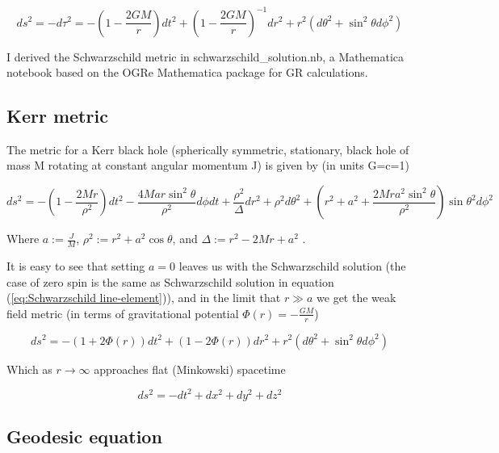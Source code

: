 \documentclass{article}
\begin{document}
\begin{equation}
    ds^2 = - d\tau^2 = - (1-\frac{2 G M}{r}) dt^2 +  (1-\frac{2 G M}{r})^{-1} dr^2
            + r^2 (d\theta^2+\sin^2\theta d\phi^2)
\label{eq:Schwarzschild line-element}
\end{equation}

I derived the Schwarzschild metric in schwarzschild\_solution.nb, a Mathematica notebook based on the OGRe Mathematica package \cite{Shoshany2021_OGRe} for GR calculations.

\subsection{Kerr metric}

The metric for a Kerr black hole (spherically symmetric, stationary, black hole of mass M rotating at constant angular momentum J) is given by (in units G=c=1)

\begin{equation}\label{eq:Kerr metric}
    ds^2 = -\left(1-\frac{2Mr}{\rho^2}\right) dt^2-\frac{4Mar \sin^2{\theta}}{\rho^2} d\phi dt+ \frac{\rho^2}{\Delta} dr^2 + \rho^2 d\theta^2 +\left(r^2+a^2+
    \frac{2Mra^2\sin^2{\theta}}{\rho^2}
    \right)\sin{\theta}^2 d\phi^2
\end{equation}

Where $a:=\frac{J}{M}$, $\rho^2:=r^2+a^2 \cos{\theta}$, and $\Delta:=r^2-2Mr+a^2$ \cite{carroll2019spacetime}.

It is easy to see that setting $a=0$ leaves us with the Schwarzschild solution (the case of zero spin is the same as Schwarzschild solution in equation (\ref{eq:Schwarzschild line-element})), and in the limit that $r \gg a$ we get the weak field metric (in terms of gravitational potential $\Phi(r)=-\frac{G M}{r}$)

\begin{equation}
    ds^2 = - (1+2\Phi(r)) dt^2 +  (1-2\Phi(r)) dr^2
            + r^2 (d\theta^2+\sin^2\theta d\phi^2)
\label{eq:Weak field metric}
\end{equation}

Which as $r\rightarrow \infty$ approaches flat (Minkowski) spacetime

\begin{equation}
    ds^2 = - dt^2 + dx^2 + dy^2 + dz^2
\label{eq:Minkowski metruc}
\end{equation}



\subsection{Geodesic equation}
\end{document}
